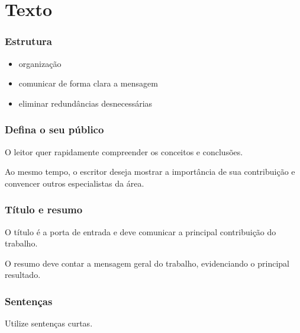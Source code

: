 \section{Texto}
\begin{frame}
\frametitle{Estrutura}
\begin{itemize}
\item<2-> organização
\item<3-> comunicar de forma clara a mensagem
\item<4-> eliminar redundâncias desnecessárias
\end{itemize}
\end{frame}

\begin{frame}
\frametitle{Defina o seu público}
O leitor quer rapidamente compreender os conceitos e conclusões.
\vspace{3ex}

\pause
Ao mesmo tempo, o escritor deseja mostrar a importância de sua contribuição e
convencer outros especialistas da área.
\end{frame}

\begin{frame}
\frametitle{Título e resumo}
O título é a porta de entrada e deve comunicar a principal contribuição do trabalho.
\pause

\vspace{3em}
O resumo deve contar a mensagem geral do trabalho, evidenciando o principal resultado.
\end{frame}

\begin{frame}
\frametitle{Sentenças}
Utilize sentenças curtas.
\end{frame}


